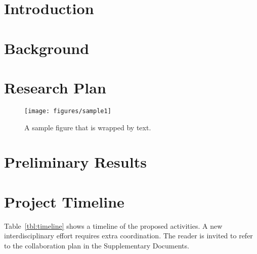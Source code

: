 
\maketitle 

\section{Introduction}
\label{sec:intro}

\lipsum{}

\section{Background}
\label{sec:bg}

\lipsum{}

\section{Research Plan}
\label{sec:methods}

\lipsum{}

\setlength\intextsep{0pt}
\begin{wrapfigure}[20]{R}{2.4in}
 \vspace{-15pt}
 \centering
 \texttt{[image: figures/sample1]}
 \caption{A sample figure that is wrapped by text.}
 \label{fig:sample}
\end{wrapfigure}

\section{Preliminary Results}
\label{sec:prior}

\lipsum[4-6]{}

\section{Project Timeline}
\label{sec:timeline}

Table~\ref{tbl:timeline} shows a timeline of the proposed activities.
A new interdisciplinary effort requires extra coordination. The reader is invited to refer to the collaboration plan in the Supplementary Documents.

